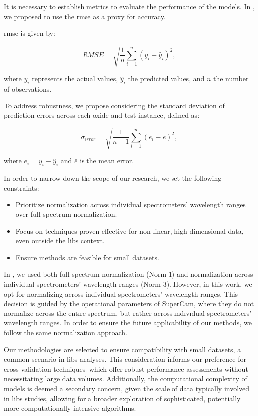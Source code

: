 It is necessary to establish metrics to evaluate the performance of the models.
In \cite{p9_paper}, we proposed to use the \gls{rmse} as a proxy for accuracy.

\gls{rmse} is given by:

\begin{equation}
    RMSE = \sqrt{\frac{1}{n} \sum_{i=1}^{n} (y_i - \hat{y}_i)^2},
\end{equation}

where $y_i$ represents the actual values, $\hat{y}_i$ the predicted values, and $n$ the number of observations.

To address robustness, we propose considering the standard deviation of prediction errors across each oxide and test instance, defined as:

\begin{equation}
    \sigma_{error} = \sqrt{\frac{1}{n-1} \sum_{i=1}^{n} (e_i - \bar{e})^2},
\end{equation}

where $e_i = y_i - \hat{y}_i$ and $\bar{e}$ is the mean error.

In order to narrow down the scope of our research, we set the following constraints:
\begin{itemize}
    \item Prioritize normalization across individual spectrometers' wavelength ranges over full-spectrum normalization.
    \item Focus on techniques proven effective for non-linear, high-dimensional data, even outside the \gls{libs} context.
    \item Ensure methods are feasible for small datasets.
\end{itemize}

In \cite{p9_paper}, we used both full-spectrum normalization (Norm 1) and normalization across individual spectrometers' wavelength ranges (Norm 3).
However, in this work, we opt for normalizing across individual spectrometers' wavelength ranges.
This decision is guided by the operational parameters of SuperCam\cite{andersonPostLandingMajorElements2022}, where they do not normalize across the entire spectrum, but rather across individual spectrometers' wavelength ranges.
In order to ensure the future applicability of our methods, we follow the same normalization approach.

Our methodologies are selected to ensure compatibility with small datasets, a common scenario in \gls{libs} analyses.
This consideration informs our preference for cross-validation techniques, which offer robust performance assessments without necessitating large data volumes.
Additionally, the computational complexity of models is deemed a secondary concern, given the scale of data typically involved in \gls{libs} studies, allowing for a broader exploration of sophisticated, potentially more computationally intensive algorithms.

